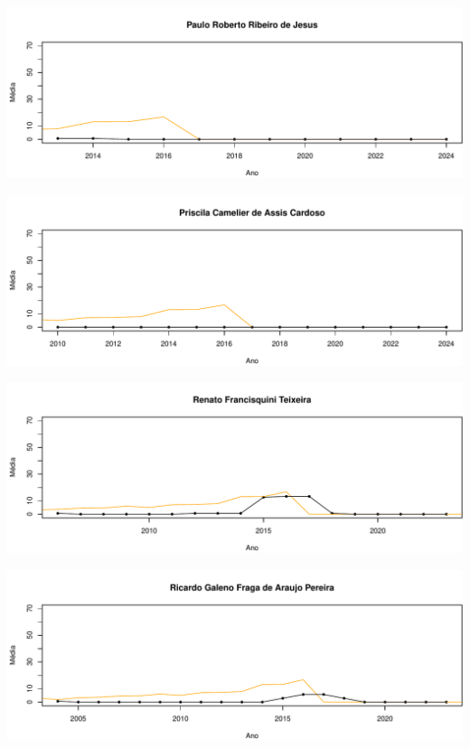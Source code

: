 \documentclass[12pt,brazil]{article}\usepackage[]{graphicx}\usepackage[]{xcolor}
\makeatletter
\def\maxwidth{ %
  \ifdim\Gin@nat@width>\linewidth
    \linewidth
  \else
    \Gin@nat@width
  \fi
}
\makeatother
\begin{document}
\vspace{0.5cm}


{\centering \includegraphics[width=\maxwidth]{figure/mediamovel-51} 

}



\vspace{0.5cm}


{\centering \includegraphics[width=\maxwidth]{figure/mediamovel-52} 

}



\vspace{0.5cm}


{\centering \includegraphics[width=\maxwidth]{figure/mediamovel-53} 

}



\vspace{0.5cm}


{\centering \includegraphics[width=\maxwidth]{figure/mediamovel-54} 

}
\end{document}
